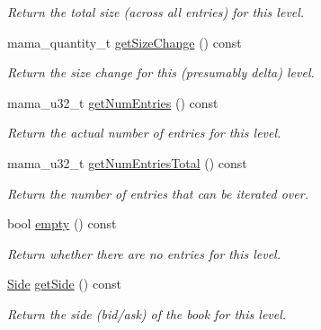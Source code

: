 \begin{CompactItemize}
\begin{CompactList}\small\item\em Return the total size (across all entries) for this level. \item\end{CompactList}\item 
mama\_\-quantity\_\-t \hyperlink{classWombat_1_1MamdaOrderBookPriceLevel_503caa5214b213027cdf972ad54a71f7}{get\-Size\-Change} () const 
\begin{CompactList}\small\item\em Return the size change for this (presumably delta) level. \item\end{CompactList}\item 
mama\_\-u32\_\-t \hyperlink{classWombat_1_1MamdaOrderBookPriceLevel_a2e83c8a0e607cb5e73982573eb267f4}{get\-Num\-Entries} () const 
\begin{CompactList}\small\item\em Return the actual number of entries for this level. \item\end{CompactList}\item 
mama\_\-u32\_\-t \hyperlink{classWombat_1_1MamdaOrderBookPriceLevel_03be2fc007075d705a710103b77f3851}{get\-Num\-Entries\-Total} () const 
\begin{CompactList}\small\item\em Return the number of entries that can be iterated over. \item\end{CompactList}\item 
bool \hyperlink{classWombat_1_1MamdaOrderBookPriceLevel_cd567e85a29da243d7930767b390d795}{empty} () const 
\begin{CompactList}\small\item\em Return whether there are no entries for this level. \item\end{CompactList}\item 
\hyperlink{classWombat_1_1MamdaOrderBookPriceLevel_384c34b0a74d874b8969dee9b0d3718d}{Side} \hyperlink{classWombat_1_1MamdaOrderBookPriceLevel_bb9667672b7ec6df0ddcd5b3887ca5de}{get\-Side} () const 
\begin{CompactList}\small\item\em Return the side (bid/ask) of the book for this level. \item\end{CompactList}\item 

\end{CompactItemize}

